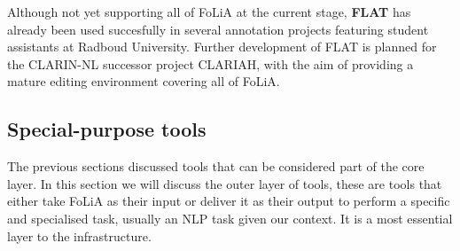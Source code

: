 \documentclass[a4paper,11pt]{article}
\begin{document}
Although not yet supporting all of FoLiA at the current stage, \textbf{FLAT} has already
been used succesfully in several annotation projects featuring student
assistants at Radboud University. Further development of FLAT is
planned for the CLARIN-NL successor project CLARIAH, with the aim of providing
a mature editing environment covering all of FoLiA.

\subsection{Special-purpose tools}

The previous sections discussed tools that can be considered part of the
core layer. In this section we will discuss the outer layer of tools, these are
tools that either take FoLiA as their input or deliver it as their output to
perform a specific and specialised task, usually an NLP task given our context.
It is a most essential layer to the infrastructure.
\end{document}
